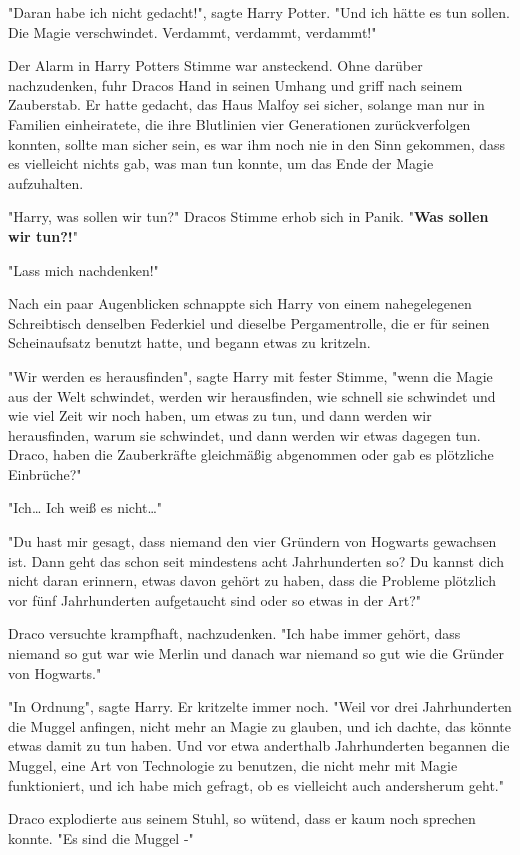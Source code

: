 {"Daran habe ich nicht gedacht!", sagte Harry Potter. "Und ich hätte es tun sollen. Die Magie verschwindet. Verdammt, verdammt, verdammt!"

Der Alarm in Harry Potters Stimme war ansteckend. Ohne darüber nachzudenken, fuhr Dracos Hand in seinen Umhang und griff nach seinem Zauberstab. Er hatte gedacht, das Haus Malfoy sei sicher, solange man nur in Familien einheiratete, die ihre Blutlinien vier Generationen zurückverfolgen konnten, sollte man sicher sein, es war ihm noch nie in den Sinn gekommen, dass es vielleicht nichts gab, was man tun konnte, um das Ende der Magie aufzuhalten.

"Harry, was sollen wir tun?" Dracos Stimme erhob sich in Panik. "\textbf{Was sollen wir tun?!}"

"Lass mich nachdenken!"

Nach ein paar Augenblicken schnappte sich Harry von einem nahegelegenen Schreibtisch denselben Federkiel und dieselbe Pergamentrolle, die er für seinen Scheinaufsatz benutzt hatte, und begann etwas zu kritzeln.

"Wir werden es herausfinden", sagte Harry mit fester Stimme, "wenn die Magie aus der Welt schwindet, werden wir herausfinden, wie schnell sie schwindet und wie viel Zeit wir noch haben, um etwas zu tun, und dann werden wir herausfinden, warum sie schwindet, und dann werden wir etwas dagegen tun. Draco, haben die Zauberkräfte gleichmäßig abgenommen oder gab es plötzliche Einbrüche?"

"Ich… Ich weiß es nicht…"

"Du hast mir gesagt, dass niemand den vier Gründern von Hogwarts gewachsen ist. Dann geht das schon seit mindestens acht Jahrhunderten so? Du kannst dich nicht daran erinnern, etwas davon gehört zu haben, dass die Probleme plötzlich vor fünf Jahrhunderten aufgetaucht sind oder so etwas in der Art?"

Draco versuchte krampfhaft, nachzudenken. "Ich habe immer gehört, dass niemand so gut war wie Merlin und danach war niemand so gut wie die Gründer von Hogwarts."

"In Ordnung", sagte Harry. Er kritzelte immer noch. "Weil vor drei Jahrhunderten die Muggel anfingen, nicht mehr an Magie zu glauben, und ich dachte, das könnte etwas damit zu tun haben. Und vor etwa anderthalb Jahrhunderten begannen die Muggel, eine Art von Technologie zu benutzen, die nicht mehr mit Magie funktioniert, und ich habe mich gefragt, ob es vielleicht auch andersherum geht."

Draco explodierte aus seinem Stuhl, so wütend, dass er kaum noch sprechen konnte. "Es sind die Muggel -"

}
